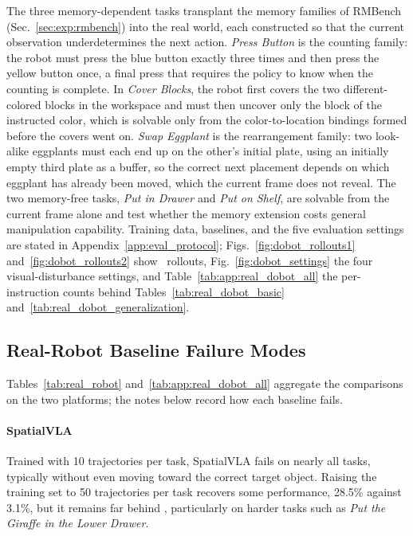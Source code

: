 The three memory-dependent tasks transplant the memory families of
RMBench (Sec.~\ref{sec:exp:rmbench}) into the real world, each
constructed so that the current observation underdetermines the next
action.
\emph{Press Button} is the counting family: the robot must press the
blue button exactly three times and then press the yellow button once,
a final press that requires the policy to know when the counting is
complete.
In \emph{Cover Blocks}, the robot first covers the two
different-colored blocks in the workspace and must then uncover only
the block of the instructed color, which is solvable only from the
color-to-location bindings formed before the covers went on.
\emph{Swap Eggplant} is the rearrangement family: two look-alike
eggplants must each end up on the other's initial plate, using an
initially empty third plate as a buffer, so the correct next placement
depends on which eggplant has already been moved, which the current
frame does not reveal.
The two memory-free tasks, \emph{Put in Drawer} and \emph{Put on
Shelf}, are solvable from the current frame alone and test whether the
memory extension costs general manipulation capability.
Training data, baselines, and the five evaluation settings are stated
in Appendix~\ref{app:eval_protocol};
Figs.~\ref{fig:dobot_rollouts1} and~\ref{fig:dobot_rollouts2} show
\memmethod\ rollouts, Fig.~\ref{fig:dobot_settings} the four
visual-disturbance settings, and Table~\ref{tab:app:real_dobot_all}
the per-instruction counts behind Tables~\ref{tab:real_dobot_basic}
and~\ref{tab:real_dobot_generalization}.

\subsection{Real-Robot Baseline Failure Modes}
\label{app:real_baselines}

Tables~\ref{tab:real_robot} and~\ref{tab:app:real_dobot_all} aggregate
the comparisons on the two platforms; the notes below record how each
baseline fails.

\paragraph{SpatialVLA~\cite{qu2025spatialvla}}
Trained with 10 trajectories per task, SpatialVLA fails on nearly all
tasks, typically without even moving toward the correct target object.
Raising the training set to 50 trajectories per task recovers some
performance, 28.5\% against 3.1\%, but it remains far behind \method,
particularly on harder tasks such as \emph{Put the Giraffe in the Lower
Drawer}.

